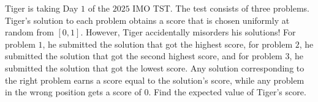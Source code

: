 Tiger is taking Day $1$ of the $2025$ IMO TST. The test consists of three problems. Tiger's solution to each problem obtains a score that is chosen uniformly at random from $[0,1]$. However, Tiger accidentally misorders his solutions! For problem $1$, he submitted the solution that got the highest score, for problem $2$, he submitted the solution that got the second highest score, and for problem $3$, he submitted the solution that got the lowest score. Any solution corresponding to the right problem earns a score equal to the solution's score, while any problem in the wrong position gets a score of $0$. Find the expected value of Tiger's score.
